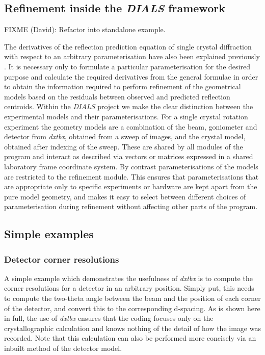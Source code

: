 \documentclass[preprint]{iucr}
\newcommand{\dxtbx}{\emph{dxtbx}\xspace}
\newcommand{\dials}{\emph{DIALS}\xspace}
\begin{document}
\subsection{Refinement inside the \dials framework}

FIXME (David): Refactor into standalone example.

The derivatives of the reflection prediction equation of single crystal 
diffraction with respect to an arbitrary parameterisation have also been 
explained previously \cite{Bricogne1987} \cite{Paciorek1999}. It is necessary only 
to formulate a particular parameterisation for the desired purpose and calculate 
the required derivatives from the general formulae in order to obtain the 
information required to perform refinement of the geometrical models based on 
the residuals between observed and predicted reflection centroids. Within the 
\dials project we make the clear distinction between the experimental models and 
their parameterisations. For a single crystal rotation experiment the geometry 
models are a combination of the beam, goniometer and detector from \dxtbx, 
obtained from a sweep of images, and the crystal model, obtained after indexing 
of the sweep. These are shared by all modules of the program and interact as 
described via vectors or matrices expressed in a shared laboratory frame 
coordinate system. By contrast parameterisations of the models are restricted 
to the refinement module. This ensures that parameterisations that are 
appropriate only to specific experiments or hardware are kept apart from the 
pure model geometry, and makes it easy to select between different choices of 
parameterisation during refinement without affecting other parts of the program.

\subsection{Simple examples}

\subsubsection{Detector corner resolutions}

A simple example which demonstrates the usefulness of \dxtbx is to compute the 
corner resolutions for a detector in an arbitrary position. Simply put, this 
needs to compute the two-theta angle between the beam and the position of each 
corner of the detector, and convert this to the corresponding d-spacing. As is 
shown here in full, the use of \dxtbx ensures that the coding focuses only on 
the crystallographic calculation and knows nothing of the detail of how the 
image was recorded. Note that this calculation can also be performed more 
concisely via an inbuilt method of the detector model.
\end{document}
